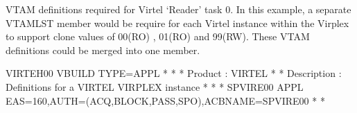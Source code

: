 \documentclass[letterpaper,10pt,english]{sphinxmanual}
\begin{document}
\ignorespaces 
{}

VTAM definitions required for Virtel ‘Reader’ task 0. In this example, a separate VTAMLST member would be require for each Virtel instance within the Virplex to support clone values of 00(RO) , 01(RO) and 99(RW). These VTAM definitions could be merged into one member.

\begin{sphinxVerbatim}[commandchars=\\\{\}]
VIRTEH00 VBUILD TYPE=APPL
* \PYGZhy{}\PYGZhy{}\PYGZhy{}\PYGZhy{}\PYGZhy{}\PYGZhy{}\PYGZhy{}\PYGZhy{}\PYGZhy{}\PYGZhy{}\PYGZhy{}\PYGZhy{}\PYGZhy{}\PYGZhy{}\PYGZhy{}\PYGZhy{}\PYGZhy{}\PYGZhy{}\PYGZhy{}\PYGZhy{}\PYGZhy{}\PYGZhy{}\PYGZhy{}\PYGZhy{}\PYGZhy{}\PYGZhy{}\PYGZhy{}\PYGZhy{}\PYGZhy{}\PYGZhy{}\PYGZhy{}\PYGZhy{}\PYGZhy{}\PYGZhy{}\PYGZhy{}\PYGZhy{}\PYGZhy{}\PYGZhy{}\PYGZhy{}\PYGZhy{}\PYGZhy{}\PYGZhy{}\PYGZhy{}\PYGZhy{}\PYGZhy{}\PYGZhy{}\PYGZhy{}\PYGZhy{}\PYGZhy{}\PYGZhy{}\PYGZhy{}\PYGZhy{}\PYGZhy{}\PYGZhy{}\PYGZhy{}\PYGZhy{}\PYGZhy{}\PYGZhy{}\PYGZhy{}\PYGZhy{}\PYGZhy{}\PYGZhy{}\PYGZhy{}\PYGZhy{}\PYGZhy{}\PYGZhy{} *
* Product     :  VIRTEL                                              *
* Description :  Definitions for a VIRTEL VIRPLEX instance           *
* \PYGZhy{}\PYGZhy{}\PYGZhy{}\PYGZhy{}\PYGZhy{}\PYGZhy{}\PYGZhy{}\PYGZhy{}\PYGZhy{}\PYGZhy{}\PYGZhy{}\PYGZhy{}\PYGZhy{}\PYGZhy{}\PYGZhy{}\PYGZhy{}\PYGZhy{}\PYGZhy{}\PYGZhy{}\PYGZhy{}\PYGZhy{}\PYGZhy{}\PYGZhy{}\PYGZhy{}\PYGZhy{}\PYGZhy{}\PYGZhy{}\PYGZhy{}\PYGZhy{}\PYGZhy{}\PYGZhy{}\PYGZhy{}\PYGZhy{}\PYGZhy{}\PYGZhy{}\PYGZhy{}\PYGZhy{}\PYGZhy{}\PYGZhy{}\PYGZhy{}\PYGZhy{}\PYGZhy{}\PYGZhy{}\PYGZhy{}\PYGZhy{}\PYGZhy{}\PYGZhy{}\PYGZhy{}\PYGZhy{}\PYGZhy{}\PYGZhy{}\PYGZhy{}\PYGZhy{}\PYGZhy{}\PYGZhy{}\PYGZhy{}\PYGZhy{}\PYGZhy{}\PYGZhy{}\PYGZhy{}\PYGZhy{}\PYGZhy{}\PYGZhy{}\PYGZhy{}\PYGZhy{}\PYGZhy{} *
SPVIRE00 APPL  EAS=160,AUTH=(ACQ,BLOCK,PASS,SPO),ACBNAME=SPVIRE00
* \PYGZhy{}\PYGZhy{}\PYGZhy{}\PYGZhy{}\PYGZhy{}\PYGZhy{}\PYGZhy{}\PYGZhy{}\PYGZhy{}\PYGZhy{}\PYGZhy{}\PYGZhy{}\PYGZhy{}\PYGZhy{}\PYGZhy{}\PYGZhy{}\PYGZhy{}\PYGZhy{}\PYGZhy{}\PYGZhy{}\PYGZhy{}\PYGZhy{}\PYGZhy{}\PYGZhy{}\PYGZhy{}\PYGZhy{}\PYGZhy{}\PYGZhy{}\PYGZhy{}\PYGZhy{}\PYGZhy{}\PYGZhy{}\PYGZhy{}\PYGZhy{}\PYGZhy{}\PYGZhy{}\PYGZhy{}\PYGZhy{}\PYGZhy{}\PYGZhy{}\PYGZhy{}\PYGZhy{}\PYGZhy{}\PYGZhy{}\PYGZhy{}\PYGZhy{}\PYGZhy{}\PYGZhy{}\PYGZhy{}\PYGZhy{}\PYGZhy{}\PYGZhy{}\PYGZhy{}\PYGZhy{}\PYGZhy{}\PYGZhy{}\PYGZhy{}\PYGZhy{}\PYGZhy{}\PYGZhy{}\PYGZhy{}\PYGZhy{}\PYGZhy{}\PYGZhy{}\PYGZhy{}\PYGZhy{} *

\end{sphinxVerbatim}
\end{document}
